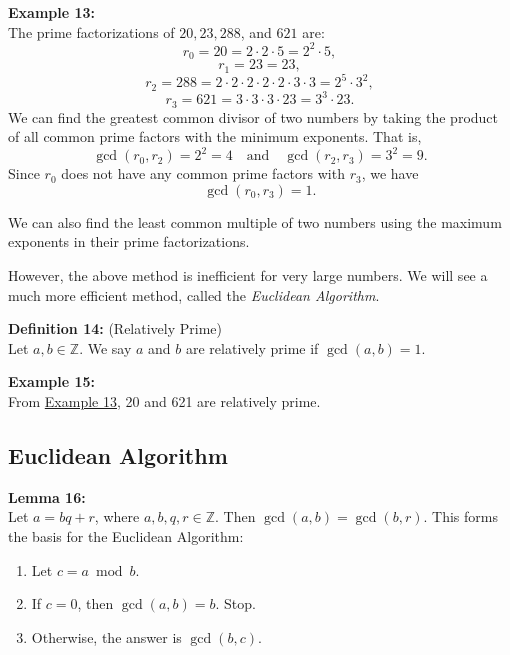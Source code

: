 \documentclass[12pt]{article}
\begin{document}
\noindent\textbf{Example 13:}
\label{ex:primefact}
\\The prime factorizations of $20, 23, 288$, and $621$ are:
\[
r_0 = 20 = 2 \cdot 2 \cdot 5 = 2^2 \cdot 5,
\]
\[
r_1 = 23 = 23,
\]
\[
r_2 = 288 = 2 \cdot 2 \cdot 2 \cdot 2 \cdot 2 \cdot 3 \cdot 3 = 2^5 \cdot 3^2,
\]
\[
r_3 = 621 = 3 \cdot 3 \cdot 3 \cdot 23 = 3^3 \cdot 23.
\]
We can find the greatest common divisor of two numbers by taking the product of all common prime factors with the minimum exponents. That is, 
\[
\gcd(r_0, r_2) = 2^2 = 4 \quad \text{and} \quad \gcd(r_2, r_3) = 3^2 = 9.
\]
Since \(r_0\) does not have any common prime factors with \(r_3\), we have
\[
\gcd(r_0, r_3) = 1.
\]

We can also find the least common multiple of two numbers using the maximum exponents in their prime factorizations.  

However, the above method is inefficient for very large numbers. We will see a much more efficient method, called the \emph{Euclidean Algorithm}.

\vspace{5mm}

\noindent\textbf{Definition 14:} (Relatively Prime)
\label{def:relprime}
\\Let $a,b \in \mathbb{Z}$. We say $a$ and $b$ are relatively prime if $\gcd(a,b) = 1$.

\vspace{5mm}

\noindent\textbf{Example 15:}
\label{ex:relprime}
\\From \hyperref[ex:primefact]{Example 13}, 20 and 621 are relatively prime.

\vspace{15mm}

\subsection{Euclidean Algorithm}

\noindent\textbf{Lemma 16:}
\label{lem:euclid}
\\Let $a=bq+r$, where $a,b,q,r \in \mathbb{Z}$. Then $\gcd(a,b) = \gcd(b,r)$.
This forms the basis for the Euclidean Algorithm:

\begin{enumerate}
    \item Let $c = a \bmod b$.
    \item If $c = 0$, then $\gcd(a,b) = b$. Stop.
    \item Otherwise, the answer is $\gcd(b,c)$.
\end{enumerate}
\end{document}
